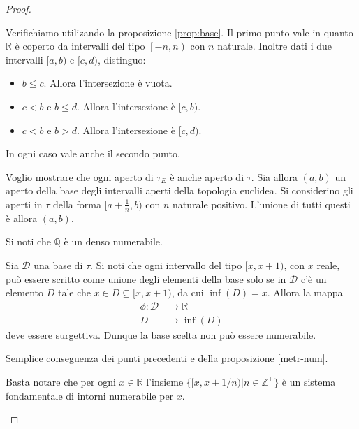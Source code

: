 \begin{proof}
    \begin{nlist}
        \item Verifichiamo utilizando la proposizione \ref{prop:base}. Il primo
        punto vale in quanto $\mathbb{R}$ \`e coperto da intervalli del tipo
        $\left[-n, n\right)$ con $n$ naturale. Inoltre dati i due intervalli
        $[a,b)$ e $[c,d)$, distinguo:
        \begin{itemize}
            \item $b\leq c$. Allora l'intersezione \`e vuota.
            \item $c < b$ e $b \leq d$. Allora l'intersezione \`e $[c,b)$.
            \item $c < b$ e $b > d$. Allora l'intersezione \`e $[c,d)$.
        \end{itemize}
        In ogni caso vale anche il secondo punto.

        \item Voglio mostrare che ogni aperto di $\tau_E$ \`e anche aperto di
        $\tau$. Sia allora $(a, b)$ un aperto della base degli intervalli
        aperti della topologia euclidea. Si considerino gli aperti in $\tau$
        della forma $[a+\frac{1}{n},b)$ con $n$ naturale positivo. L'unione di
        tutti questi \`e allora $(a,b)$.

        \item Si noti che $\mathbb{Q}$ \`e un denso numerabile.

        \item Sia $\mathcal{D}$ una base di $\tau$. Si noti che ogni intervallo
        del tipo $[x,x+1)$, con $x$ reale, pu\`o essere scritto come unione
        degli elementi della base solo se in $\mathcal{D}$ c'\`e un elemento $D$
        tale che $x \in D \subseteq [x, x+1)$, da cui $\inf(D) = x$. Allora la
        mappa
        \begin{align*}
            \phi:\mathcal{D}&\to \mathbb{R}\\
            D & \mapsto \inf(D)
        \end{align*}
        deve essere surgettiva. Dunque la base scelta non pu\`o essere
        numerabile.

        \item Semplice conseguenza dei punti precedenti e della proposizione
        \ref{metr-num}.

				\item Basta notare che per ogni $x \in \mathbb{R}$ l'insieme $\{
				[x, x+1/n) | n \in \mathbb{Z}^+\}$ è un sistema fondamentale di intorni
				numerabile per $x$.
    \end{nlist}
\end{proof}

